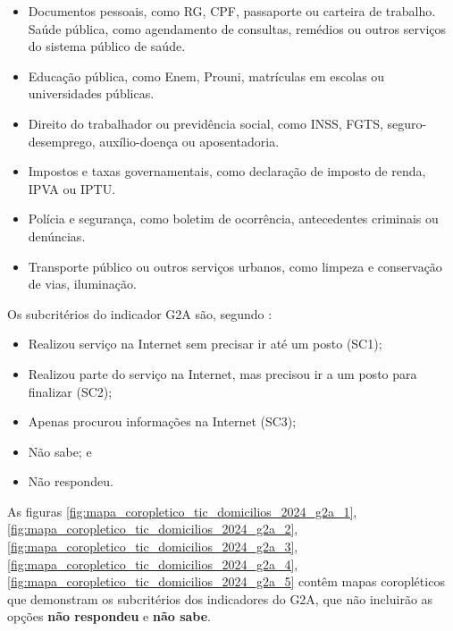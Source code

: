 \begin{itemize}
	\item Documentos pessoais, como RG, CPF, passaporte ou carteira de trabalho.
	Saúde pública, como agendamento de consultas, remédios ou outros serviços do sistema público de saúde.
	\item Educação pública, como Enem, Prouni, matrículas em escolas ou universidades públicas.
	\item Direito do trabalhador ou previdência social, como INSS, FGTS, seguro-desemprego, auxílio-doença ou aposentadoria.
	\item Impostos e taxas governamentais, como declaração de imposto de renda, IPVA ou IPTU.
	\item Polícia e segurança, como boletim de ocorrência, antecedentes criminais ou denúncias.
	\item Transporte público ou outros serviços urbanos, como limpeza e conservação de vias, iluminação.
\end{itemize}

Os subcritérios do indicador G2A são, segundo \cite{tic_domicilios_2024_g2a}:

\begin{itemize}
    \item Realizou serviço na Internet sem precisar ir até um posto (SC1);  \item Realizou parte do serviço na Internet, mas precisou ir a um posto para finalizar (SC2);
    \item Apenas procurou informações na Internet (SC3);
    \item Não sabe; e
    \item Não respondeu.
\end{itemize}

As figuras \ref{fig:mapa_coropletico_tic_domicilios_2024_g2a_1}, \ref{fig:mapa_coropletico_tic_domicilios_2024_g2a_2}, \ref{fig:mapa_coropletico_tic_domicilios_2024_g2a_3},
\ref{fig:mapa_coropletico_tic_domicilios_2024_g2a_4},
\ref{fig:mapa_coropletico_tic_domicilios_2024_g2a_5} contêm mapas coropléticos que demonstram os subcritérios dos indicadores do G2A, que não incluirão as opções \textbf{não respondeu} e \textbf{não sabe}.

